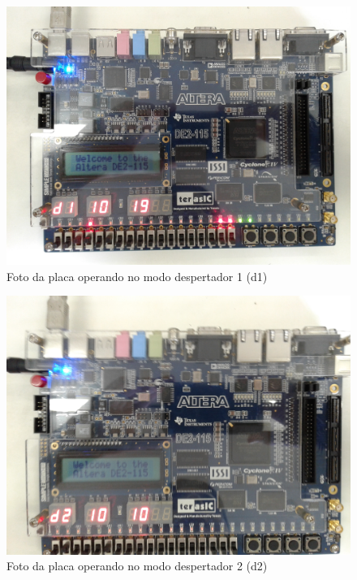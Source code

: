 \documentclass[14pt, oneside]{book}
\theoremstyle{definition}
\begin{document}
               \begin{figure}[H]
                    \centering
                    \includegraphics[width=\columnwidth]{foto_placa_d1.jpg}
                    \caption{Foto da placa operando no modo despertador 1 (d1)}
                    \label{foto_despertador1}
                \end{figure}
                
                \begin{figure}[H]
                    \centering
                    \includegraphics[width=\columnwidth]{foto_placa_d2.jpg}
                    \caption{Foto da placa operando no modo despertador 2 (d2)}
                    \label{foto_despertador2}
                \end{figure}
                
\end{document}

